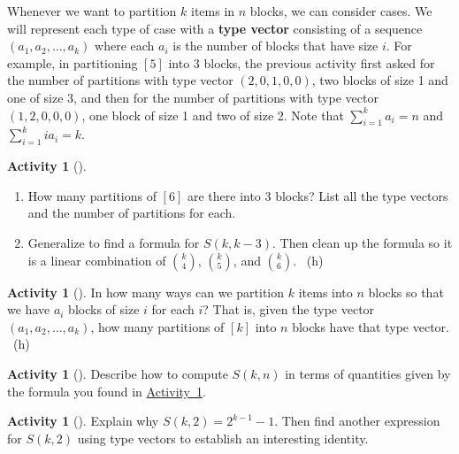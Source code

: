 \documentclass[10pt,]{book}
\newcommand{\terminology}[1]{\textbf{#1}}
\theoremstyle{plain}
\theoremstyle{definition}
\theoremstyle{definition}
\theoremstyle{definition}
\newtheorem{activity}[project]{Activity}
\numberwithin{equation}{chapter}
\begin{document}
\hypertarget{p-1409}{}%
 Whenever we want to partition \(k\) items in \(n\) blocks, we can consider cases.  We will represent each type of case with a \terminology{type vector} consisting of a sequence \((a_1, a_2, \ldots, a_k)\) where each \(a_i\) is the number of blocks that have size \(i\).  For example, in partitioning \([5]\) into 3 blocks, the previous activity first asked for the number of partitions with type vector \((2,0,1,0,0)\), two blocks of size 1 and one of size 3, and then for the number of partitions with type vector \((1,2,0,0,0)\), one block of size 1 and two of size 2.  Note that \(\sum_{i=1}^k a_i = n\) and \(\sum_{i=1}^k ia_i = k\).%
\begin{activity}[]\label{activity-268}
\leavevmode%
\begin{enumerate}[font=\bfseries,label=(\alph*),ref=\alph*]
\item\label{task-259} \hypertarget{p-1410}{}%
How many partitions of \([6]\) are there into 3 blocks?  List all the type vectors and the number of partitions for each.%
\item\label{task-260} \hypertarget{p-1411}{}%
Generalize to find a formula for \(S(k,k-3)\).  Then clean up the formula so it is a linear combination of \(\binom{k}{4}\), \(\binom{k}{5}\), and \(\binom{k}{6}\).%
~{\tiny (h)}\end{enumerate}
\end{activity}
\begin{activity}[]\label{partitionsgivenpartsize}
\hypertarget{p-1413}{}%
In how many ways can we partition \(k\) items into \(n\) blocks so that we have \(a_i\) blocks of size \(i\) for each \(i\)? That is, given the type vector \((a_1, a_2, \ldots, a_k)\), how many partitions of \([k]\) into \(n\) blocks have that type vector.%
~{\tiny (h)}\end{activity}
\begin{activity}[]\label{activity-270}
\hypertarget{p-1416}{}%
Describe how to compute \(S(k,n)\) in terms of quantities given by the formula you found in \hyperref[partitionsgivenpartsize]{Activity~\ref{partitionsgivenpartsize}}.%
\end{activity}
\begin{activity}[]\label{activity-271}
\hypertarget{p-1418}{}%
Explain why \(S(k, 2) = 2^{k-1} - 1\).  Then find another expression for \(S(k,2)\) using type vectors to establish an interesting identity.%
\end{activity}
\typeout{************************************************}
\typeout{************************************************}
\end{document}
